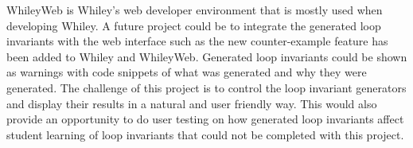WhileyWeb is Whiley's web developer environment that is mostly used when
developing Whiley.
A future project could be to integrate the generated loop invariants with
the web interface such as the new counter-example feature has been added to
Whiley and WhileyWeb.
Generated loop invariants could be shown as warnings with code snippets of what
was generated and why they were generated.
The challenge of this project is to control the loop invariant
generators and display their results in a natural and user friendly way.
This would also provide an opportunity to do user testing on how generated
loop invariants affect student learning of loop invariants that could not be
completed with this project.
